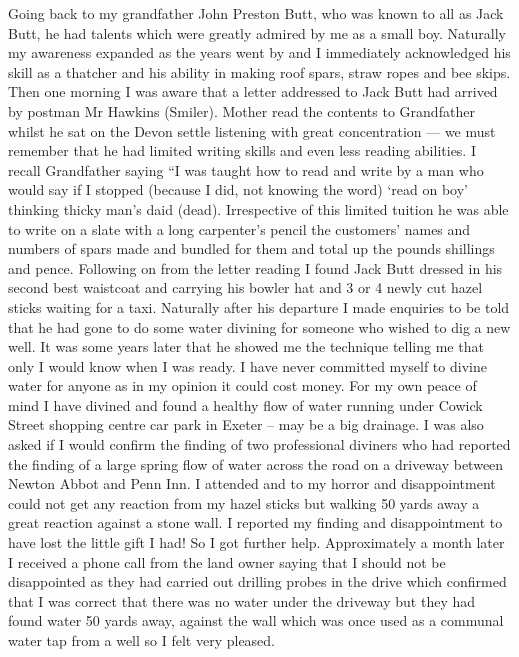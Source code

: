 Going back to my grandfather John Preston Butt, who was known to all as Jack
Butt, he had talents which were greatly admired by me as a small boy. Naturally
my awareness expanded as the years went by and I immediately acknowledged his
skill as a thatcher and his ability in making roof spars, straw ropes and bee
skips. Then one morning I was aware that a letter addressed to Jack Butt had
arrived by postman Mr Hawkins (Smiler). Mother read the contents to Grandfather
whilst he sat on the Devon settle listening with great concentration --- we
must remember that he had limited writing skills and even less reading
abilities. I recall Grandfather saying ``I was taught how to read and write by
a man who would say if I stopped (because I did, not knowing the word) `read on
boy' thinking thicky man's daid (dead). Irrespective of this limited tuition he
was able to write on a slate with a long carpenter's pencil the customers'
names and numbers of spars made and bundled for them and total up the pounds
shillings and pence. Following on from the letter reading I found Jack Butt
dressed in his second best waistcoat and carrying his bowler hat and 3 or 4
newly cut hazel sticks waiting for a taxi. Naturally after his departure I made
enquiries to be told that he had gone to do some water divining for someone who
wished to dig a new well. It was some years later that he showed me the
technique telling me that only I would know when I was ready. I have never
committed myself to divine water for anyone as in my opinion it could cost
money. For my own peace of mind I have divined and found a healthy flow of
water running under Cowick Street shopping centre car park in Exeter – may be a
big drainage. I was also asked if I would confirm the finding of two
professional diviners who had reported the finding of a large spring flow of
water across the road on a driveway between Newton Abbot and Penn Inn. I
attended and to my horror and disappointment could not get any reaction from my
hazel sticks but walking 50 yards away a great reaction against a stone wall. I
reported my finding and disappointment to have lost the little gift I had! So I
got further help. Approximately a month later I received a phone call from the
land owner saying that I should not be disappointed as they had carried out
drilling probes in the drive which confirmed that I was correct that there was
no water under the driveway but they had found water 50 yards away, against the
wall which was once used as a communal water tap from a well so I felt very
pleased.

